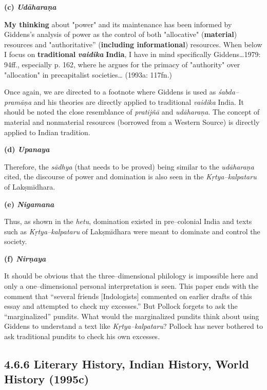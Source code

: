 \textbf{(c) \textit{Udāharaṇa}}

\begin{myquote}
\textbf{My thinking} about "power" and its maintenance has been informed by Giddens's analysis of power as the control of both "allocative" (\textbf{material}) resources and "authoritative'' (\textbf{including informational}) resources. When below I focus on \textbf{traditional }\textit{\textbf{vaidika }}\textbf{India}, I have in mind specifically Giddens…1979: 94ff., especially p. 162, where he argues for the primacy of "authority" over "allocation" in precapitalist societies… (1993a: 117fn.)
\end{myquote}

Once again, we are directed to a footnote where Giddens is used as \textit{śabda–pramāṇa} and his theories are directly applied to traditional \textit{vaidika} India. It should be noted the close resemblance of \textit{pratijñā} and \textit{udāharaṇa}. The concept of material and nonmaterial resources (borrowed from a Western Source) is directly applied to Indian tradition.

\textbf{(d) \textit{Upanaya}}

Therefore, the \textit{sādhya} (that needs to be proved) being similar to the \textit{udāharaṇa} cited, the discourse of power and domination is also seen in the \textit{Kṛtya–kalpataru} of Lakṣmīdhara.

\textbf{(e) \textit{Nigamana}}

Thus, as shown in the \textit{hetu}, domination existed in pre–colonial India and texts such as \textit{Kṛtya–kalpataru }of Lakṣmīdhara were meant to dominate and control the society.

\textbf{(f) \textit{Nirṇaya}}

It should be obvious that the three–dimensional philology is impossible here and only a one–dimensional personal interpretation is seen. This paper ends with the comment that “several friends [Indologists] commented on earlier drafts of this essay and attempted to check my excesses.” But Pollock forgets to ask the “marginalized” pundits. What would the marginalized pundits think about using Giddens to understand a text like \textit{Kṛtya–kalpataru}? Pollock has never bothered to ask traditional pundits to check his own excesses.


\subsection*{4.6.6 Literary History, Indian History, World History (1995c)}

